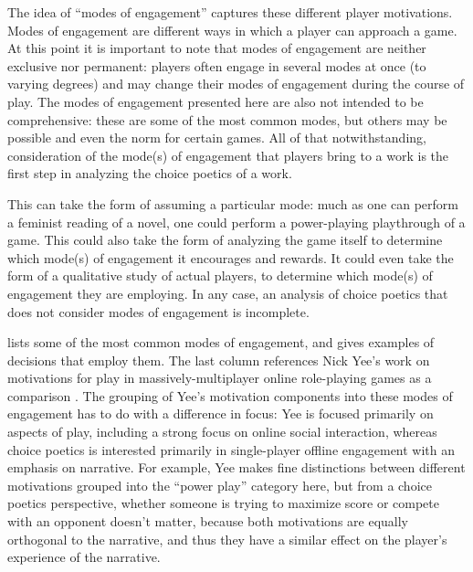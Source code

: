The idea of ``modes of engagement'' captures these different player motivations.
%
Modes of engagement are different ways in which a player can approach a game.
%
At this point it is important to note that modes of engagement are neither exclusive nor permanent: players often engage in several modes at once (to varying degrees) and may change their modes of engagement during the course of play.
%
The modes of engagement presented here are also not intended to be comprehensive: these are some of the most common modes, but others may be possible and even the norm for certain games.
%
All of that notwithstanding, consideration of the mode(s) of engagement that players bring to a work is the first step in analyzing the choice poetics of a work.


This can take the form of assuming a particular mode: much as one can perform a feminist reading of a novel, one could perform a power-playing playthrough of a game.
%
This could also take the form of analyzing the game itself to determine which mode(s) of engagement it encourages and rewards.
%
It could even take the form of a qualitative study of actual players, to determine which mode(s) of engagement they are employing.
%
In any case, an analysis of choice poetics that does not consider modes of engagement is incomplete.


 lists some of the most common modes of engagement, and gives examples of decisions that employ them.
%
The last column references Nick Yee's work on motivations for play in massively-multiplayer online role-playing games as a comparison \citep{Yee2006}.
%
The grouping of Yee's motivation components into these modes of engagement has to do with a difference in focus: Yee is focused primarily on aspects of play, including a strong focus on online social interaction, whereas choice poetics is interested primarily in single-player offline engagement with an emphasis on narrative.
%
For example, Yee makes fine distinctions between different motivations grouped into the ``power play'' category here, but from a choice poetics perspective, whether someone is trying to maximize score or compete with an opponent doesn't matter, because both motivations are equally orthogonal to the narrative, and thus they have a similar effect on the player's experience of the narrative.


